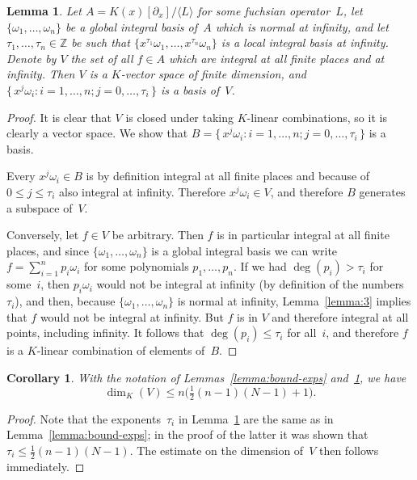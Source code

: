 \documentclass[final,1p,times,authoryear]{elsarticle}
\newtheorem{corollary}[theorem]{Corollary}
\newtheorem{lemma}[theorem]{Lemma}
\def\<#1>{\langle#1\rangle}
\let\set\mathbb
\begin{document}
\begin{lemma}\label{lemma:nopoles-space}
  Let $A=K(x)[\partial_x]/\<L>$ for some fuchsian operator~$L$, let
  $\{\omega_1,\dots,\omega_n\}$ be a global integral basis of~$A$ which is
  normal at infinity, and let $\tau_1,\dots,\tau_n\in\set Z$ be such that
  $\{x^{\tau_1}\omega_1,\dots,x^{\tau_n}\omega_n\}$ is a local integral basis
  at infinity. Denote by $V$ the set of all $f\in A$ which are integral at all
  finite places and at infinity.  Then $V$ is a $K$-vector space of finite
  dimension, and $\{\,x^j\omega_i : i=1,\dots,n; j=0,\dots,\tau_i\,\}$ is a
  basis of~$V$.
\end{lemma}
\begin{proof}
  It is clear that $V$ is closed under taking $K$-linear combinations, so it is clearly a vector space.
  We show that $B=\{\,x^j\omega_i : i=1,\dots,n; j=0,\dots,\tau_i\,\}$ is a basis.

  Every $x^j\omega_i\in B$ is by definition integral at all finite places and because of $0\leq j\leq \tau_i$ also
  integral at infinity. Therefore $x^j\omega_i\in V$, and therefore $B$ generates a subspace of~$V$.

  Conversely, let $f\in V$ be arbitrary. Then $f$ is in particular integral at all finite places,
  and since $\{\omega_1,\dots,\omega_n\}$ is a global integral basis we can write $f=\sum_{i=1}^n p_i\omega_i$
  for some polynomials $p_1,\dots,p_n$.
  If we had $\deg(p_i)>\tau_i$ for some~$i$, then $p_i\omega_i$ would not be integral at infinity
  (by definition of the numbers~$\tau_i$), and then, because $\{\omega_1,\dots,\omega_n\}$ is normal
  at infinity, Lemma~\ref{lemma:3} implies that $f$ would not be integral at infinity.
  But $f$ is in $V$ and therefore integral at all points, including infinity.
  It follows that $\deg(p_i)\leq \tau_i$ for all~$i$, and therefore $f$ is a $K$-linear combination
  of elements of~$B$.
\end{proof}

\begin{corollary}
With the notation of Lemmas~\ref{lemma:bound-exps}
and~\ref{lemma:nopoles-space}, we have
\[
  \dim_K(V)\leq n\bigl(\tfrac12(n-1)(N-1)+1\bigr).
\]
\end{corollary}
\begin{proof}
Note that the exponents~$\tau_i$ in Lemma~\ref{lemma:nopoles-space} are the
same as in Lemma~\ref{lemma:bound-exps}; in the proof of the latter it was
shown that $\tau_i\leq\frac12(n-1)(N-1)$. The estimate on the dimension of~$V$
then follows immediately.
\end{proof}
\end{document}
